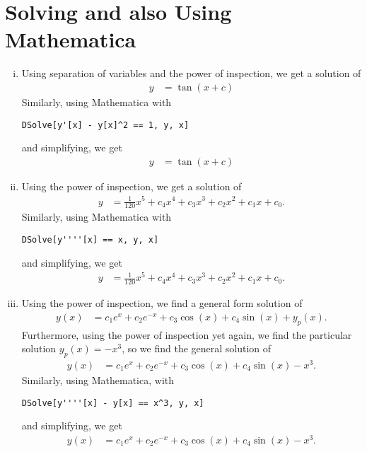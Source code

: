 \documentclass[10pt]{mypackage}
\begin{document}
\section{Solving and also Using Mathematica}%
\begin{enumerate}[(i)]
  \item Using separation of variables and the power of inspection, we get a solution of
    \begin{align*}
      y &= \tan\left(x + c\right)
    \end{align*}
    Similarly, using Mathematica with
    \begin{lstlisting}[style=mathematicastyle]
    DSolve[y'[x] - y[x]^2 == 1, y, x]
    \end{lstlisting}
    and simplifying, we get
    \begin{align*}
      y &= \tan\left(x+c\right)
    \end{align*}
  \item Using the power of inspection, we get a solution of
    \begin{align*}
      y &= \frac{1}{120}x^5 + c_4x^4 + c_3x^3 + c_2 x^2 + c_1 x + c_0.
    \end{align*}
    Similarly, using Mathematica with
    \begin{lstlisting}[style=mathematicastyle]
      DSolve[y''''[x] == x, y, x]
    \end{lstlisting}
    and simplifying, we get
    \begin{align*}
      y &= \frac{1}{120}x^5 + c_4x^4 + c_3x^3 + c_2 x^2 + c_1 x + c_0.
    \end{align*}
  \item Using the power of inspection, we find a general form solution of
    \begin{align*}
      y(x) &= c_1e^x + c_2e^{-x} + c_3\cos\left(x\right) + c_4\sin\left(x\right) + y_p(x).
    \end{align*}
    Furthermore, using the power of inspection yet again, we find the particular solution $y_p(x) = -x^3$, so we find the general solution of
    \begin{align*}
      y(x) &= c_1e^x + c_2e^{-x} + c_3\cos\left(x\right) + c_4\sin\left(x\right) - x^3.
    \end{align*}
    Similarly, using Mathematica, with
    \begin{lstlisting}[style=mathematicastyle]
    DSolve[y''''[x] - y[x] == x^3, y, x]
    \end{lstlisting}
    and simplifying, we get
    \begin{align*}
      y(x) &= c_1e^x + c_2e^{-x} + c_3\cos\left(x\right) + c_4\sin\left(x\right) - x^3.
    \end{align*}
    
\end{enumerate}
\end{document}
